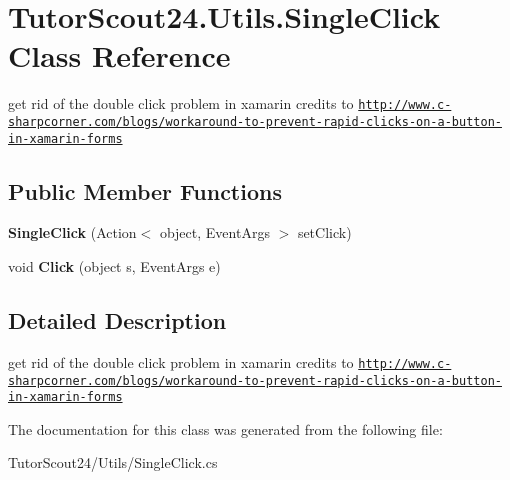 \hypertarget{class_tutor_scout24_1_1_utils_1_1_single_click}{}\section{Tutor\+Scout24.\+Utils.\+Single\+Click Class Reference}
\label{class_tutor_scout24_1_1_utils_1_1_single_click}


get rid of the double click problem in xamarin credits to \href{http://www.c-sharpcorner.com/blogs/workaround-to-prevent-rapid-clicks-on-a-button-in-xamarin-forms}{\tt http\+://www.\+c-\/sharpcorner.\+com/blogs/workaround-\/to-\/prevent-\/rapid-\/clicks-\/on-\/a-\/button-\/in-\/xamarin-\/forms}  


\subsection*{Public Member Functions}
\begin{DoxyCompactItemize}
\item 
\mbox{\label{class_tutor_scout24_1_1_utils_1_1_single_click_a8ee9a75a5b72440e2b3e0c7124f97c45}} 
{\bfseries Single\+Click} (Action$<$ object, Event\+Args $>$ set\+Click)
\item 
\mbox{\label{class_tutor_scout24_1_1_utils_1_1_single_click_a900daeec57f0eb9af9035bae7986531a}} 
void {\bfseries Click} (object s, Event\+Args e)
\end{DoxyCompactItemize}


\subsection{Detailed Description}
get rid of the double click problem in xamarin credits to \href{http://www.c-sharpcorner.com/blogs/workaround-to-prevent-rapid-clicks-on-a-button-in-xamarin-forms}{\tt http\+://www.\+c-\/sharpcorner.\+com/blogs/workaround-\/to-\/prevent-\/rapid-\/clicks-\/on-\/a-\/button-\/in-\/xamarin-\/forms} 



The documentation for this class was generated from the following file\+:\begin{DoxyCompactItemize}
\item 
Tutor\+Scout24/\+Utils/Single\+Click.\+cs\end{DoxyCompactItemize}
